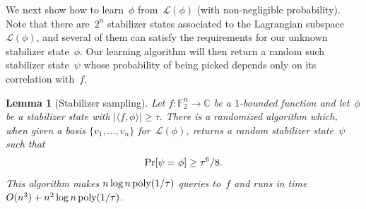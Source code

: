 \documentclass[11pt]{amsart}
\renewcommand{\Pr}{\mathop{\mbox{\rm Pr}}}
\newcommand{\C}{\mathbb{C}} %
\newcommand{\F}{\mathbb{F}} %
\newcommand{\Lcal}{\mathcal{L}}
\newcommand{\poly}{\mbox{\rm poly}}
\theoremstyle{plain}
\newtheorem{lemma}[theorem]{Lemma}
\theoremstyle{definition}
\theoremstyle{remark}
\begin{document}
We next show how to learn~$\phi$ from~$\Lcal(\phi)$ (with non-negligible probability).
Note that there are~$2^n$ stabilizer states associated to the Lagrangian subspace~$\Lcal(\phi)$, and several of them can satisfy the requirements for our unknown stabilizer state~$\phi$.
Our learning algorithm will then return a random such stabilizer state~$\psi$ whose probability of being picked depends only on its correlation with~$f$.

\begin{lemma}[Stabilizer sampling]\label{lem:linear}
    Let $f: \F_2^n \to \C$ be a $1$-bounded function and let~$\phi$ be a stabilizer state with $|\langle f, \phi\rangle| \geq \tau$.
    There is a randomized algorithm which, when given a basis $\{v_1, \dots, v_n\}$ for~$\Lcal(\phi)$, returns a random stabilizer state~$\psi$ such that
    $$\Pr[\psi = \phi] \geq \tau^6/8.$$
    This algorithm makes $n \log n\, \poly(1/\tau)$ queries to~$f$ and runs in time $O(n^3) + n^2\log n\, \poly(1/\tau)$.
\end{lemma}
\end{document}
